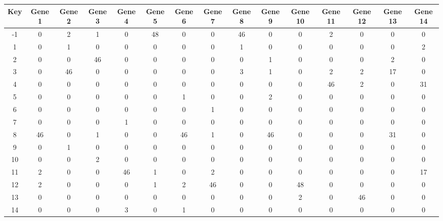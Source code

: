 \begin{tabular}{|c|c|c|c|c|c|c|c|c|c|c|c|c|c|c|}
\hline
Key & Gene 1 & Gene 2 & Gene 3 & Gene 4 & Gene 5 & Gene 6 & Gene 7 & Gene 8 & Gene 9 & Gene 10 & Gene 11 & Gene 12 & Gene 13 & Gene 14 \\
\hline
-1 & 0 & 2 & 1 & 0 & 48 & 0 & 0 & 46 & 0 & 0 & 2 & 0 & 0 & 0 \\
1 & 0 & 1 & 0 & 0 & 0 & 0 & 0 & 1 & 0 & 0 & 0 & 0 & 0 & 2 \\
2 & 0 & 0 & 46 & 0 & 0 & 0 & 0 & 0 & 1 & 0 & 0 & 0 & 2 & 0 \\
3 & 0 & 46 & 0 & 0 & 0 & 0 & 0 & 3 & 1 & 0 & 2 & 2 & 17 & 0 \\
4 & 0 & 0 & 0 & 0 & 0 & 0 & 0 & 0 & 0 & 0 & 46 & 2 & 0 & 31 \\
5 & 0 & 0 & 0 & 0 & 0 & 1 & 0 & 0 & 2 & 0 & 0 & 0 & 0 & 0 \\
6 & 0 & 0 & 0 & 0 & 0 & 0 & 1 & 0 & 0 & 0 & 0 & 0 & 0 & 0 \\
7 & 0 & 0 & 0 & 1 & 0 & 0 & 0 & 0 & 0 & 0 & 0 & 0 & 0 & 0 \\
8 & 46 & 0 & 1 & 0 & 0 & 46 & 1 & 0 & 46 & 0 & 0 & 0 & 31 & 0 \\
9 & 0 & 1 & 0 & 0 & 0 & 0 & 0 & 0 & 0 & 0 & 0 & 0 & 0 & 0 \\
10 & 0 & 0 & 2 & 0 & 0 & 0 & 0 & 0 & 0 & 0 & 0 & 0 & 0 & 0 \\
11 & 2 & 0 & 0 & 46 & 1 & 0 & 2 & 0 & 0 & 0 & 0 & 0 & 0 & 17 \\
12 & 2 & 0 & 0 & 0 & 1 & 2 & 46 & 0 & 0 & 48 & 0 & 0 & 0 & 0 \\
13 & 0 & 0 & 0 & 0 & 0 & 0 & 0 & 0 & 0 & 2 & 0 & 46 & 0 & 0 \\
14 & 0 & 0 & 0 & 3 & 0 & 1 & 0 & 0 & 0 & 0 & 0 & 0 & 0 & 0 \\
\hline
\end{tabular}